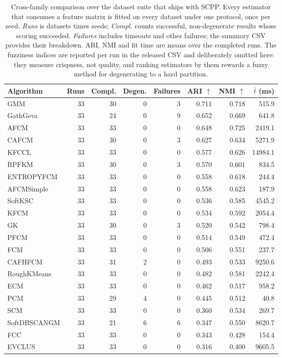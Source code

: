 \begin{table}[t]
\centering
\small
\caption{Cross-family comparison over the dataset suite that ships with SCPP. Every estimator that consumes a feature matrix is fitted on every dataset under one protocol, once per seed. \emph{Runs} is datasets times seeds; \emph{Compl.} counts successful, non-degenerate results whose scoring succeeded. \emph{Failures} includes timeouts and other failures; the summary CSV provides their breakdown. ARI, NMI and fit time are means over the completed runs. The fuzziness indices are reported per run in the released CSV and deliberately omitted here: they measure crispness, not quality, and ranking estimators by them rewards a fuzzy method for degenerating to a hard partition.}
\label{tab:main-benchmark}
\begin{tabular}{lrrrrrrr}
\toprule
Algorithm & Runs & Compl. & Degen. & Failures & ARI $\uparrow$ & NMI $\uparrow$ & $\bar{t}$ (ms) \\
\midrule
GMM & 33 & 30 & 0 & 3 & 0.711 & 0.718 & 515.9 \\
GathGeva & 33 & 24 & 0 & 9 & 0.652 & 0.669 & 641.8 \\
AFCM & 33 & 33 & 0 & 0 & 0.648 & 0.725 & 2419.1 \\
CAFCM & 33 & 30 & 0 & 3 & 0.627 & 0.634 & 5271.9 \\
KFCCL & 33 & 33 & 0 & 0 & 0.577 & 0.626 & 14984.1 \\
RPFKM & 33 & 30 & 0 & 3 & 0.570 & 0.601 & 834.5 \\
ENTROPYFCM & 33 & 33 & 0 & 0 & 0.558 & 0.618 & 244.4 \\
AFCMSimple & 33 & 33 & 0 & 0 & 0.558 & 0.623 & 187.9 \\
SoftKSC & 33 & 33 & 0 & 0 & 0.536 & 0.585 & 4545.2 \\
KFCM & 33 & 33 & 0 & 0 & 0.534 & 0.592 & 2054.4 \\
GK & 33 & 30 & 0 & 3 & 0.520 & 0.542 & 798.4 \\
PFCM & 33 & 33 & 0 & 0 & 0.514 & 0.549 & 472.4 \\
FCM & 33 & 33 & 0 & 0 & 0.506 & 0.551 & 237.7 \\
CAFHFCM & 33 & 31 & 2 & 0 & 0.493 & 0.533 & 9250.6 \\
RoughKMeans & 33 & 33 & 0 & 0 & 0.482 & 0.581 & 2242.4 \\
ECM & 33 & 33 & 0 & 0 & 0.462 & 0.517 & 958.2 \\
PCM & 33 & 29 & 4 & 0 & 0.445 & 0.512 & 40.8 \\
SCM & 33 & 33 & 0 & 0 & 0.360 & 0.534 & 269.7 \\
SoftDBSCANGM & 33 & 21 & 6 & 6 & 0.347 & 0.550 & 8620.7 \\
FCC & 33 & 33 & 0 & 0 & 0.343 & 0.428 & 154.4 \\
EVCLUS & 33 & 33 & 0 & 0 & 0.316 & 0.400 & 9605.5 \\
\bottomrule
\end{tabular}
\end{table}
